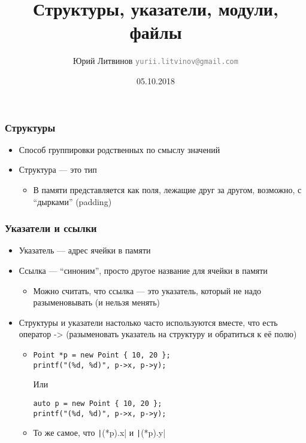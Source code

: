 \documentclass[xetex,mathserif,serif]{beamer}
\title{Структуры, указатели, модули, файлы}
\author[Юрий Литвинов]{Юрий Литвинов \newline \textcolor{gray}{\small\texttt{yurii.litvinov@gmail.com}}}
\date{05.10.2018}
\begin{document}
	
	\frame{\titlepage}
	
	\begin{frame}
		\frametitle{Структуры}
		\begin{itemize}
			\item Способ группировки родственных по смыслу значений
			\item Структура --- это тип
			\begin{itemize}
				\item В памяти представляется как поля, лежащие друг за другом, возможно, с ``дырками'' (padding)
			\end{itemize}
		\end{itemize}
	\end{frame}

	\begin{frame}[fragile]
		\frametitle{Указатели и ссылки}
		\begin{itemize}
			\item Указатель --- адрес ячейки в памяти
			\item Ссылка --- ``синоним'', просто другое название для ячейки в памяти
			\begin{itemize}
				\item Можно считать, что ссылка --- это указатель, который не надо разыменовывать (и нельзя менять)
			\end{itemize}
			\item Структуры и указатели настолько часто используются вместе, что есть оператор -> (разыменовать указатель на структуру и обратиться к её полю)
			\begin{itemize}
				\item 
				\begin{footnotesize}
					\begin{verbatim}
Point *p = new Point { 10, 20 };
printf("(%d, %d)", p->x, p->y);
					\end{verbatim}
					Или
					\begin{verbatim}
auto p = new Point { 10, 20 };
printf("(%d, %d)", p->x, p->y);
					\end{verbatim}
				\end{footnotesize}
				\item То же самое, что \texttt|(*p).x| и \texttt|(*p).y|
			\end{itemize}
		\end{itemize}
	\end{frame}
\end{document}

